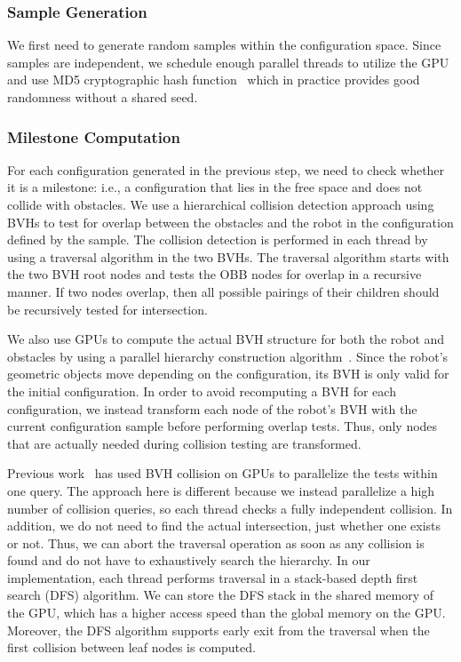 \subsubsection{Sample Generation}
We first need to generate random samples within the configuration space. Since samples are independent, we schedule enough parallel threads to utilize the GPU and use MD5 cryptographic hash function~\cite{Tzeng08} which in practice provides good randomness without a shared seed.

\subsubsection{Milestone Computation}
For each configuration generated in the previous step, we need to check whether it is a milestone: i.e., a configuration that lies in the free space and does not collide with obstacles. We use a hierarchical collision detection approach using BVHs to test for overlap between the obstacles and the robot in the configuration defined by the sample. The collision detection is performed in each thread by using a traversal algorithm in the two BVHs. The traversal algorithm starts with the two BVH root nodes and tests the OBB nodes for overlap in a recursive manner. If two nodes overlap, then all possible pairings of their children should be recursively tested for intersection.

We also use GPUs to compute the actual BVH structure for both the robot and obstacles by using a parallel hierarchy construction algorithm~\cite{LauterbachGSLM09}. Since the robot's geometric objects move depending on the configuration, its BVH is only valid for the initial configuration. In order to avoid recomputing a BVH for each configuration, we instead transform each node of the robot's BVH with the current configuration sample before performing overlap tests. Thus, only nodes that are actually needed during collision testing are transformed.

Previous work~\cite{Lauterbach10} has used BVH collision on GPUs to parallelize the tests within one query. The approach here is different because we instead parallelize a high number of collision queries, so each thread checks a fully independent collision. In addition, we do not need to find the actual intersection, just whether one exists or not. Thus, we can abort the traversal operation as soon as any collision is found and do not have to exhaustively search the hierarchy. In our implementation, each thread performs traversal in a stack-based depth first search (DFS) algorithm. We can store the DFS stack in the shared memory of the GPU, which has a higher access speed than the global memory on the GPU. Moreover, the DFS algorithm supports early exit from the traversal when the first collision between leaf nodes is computed.

